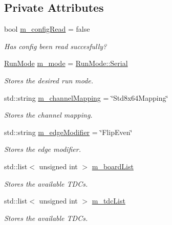 \subsection*{Private Attributes}
\begin{DoxyCompactItemize}
\item 
bool \hyperlink{class_config_a82bcc998ae058699369aee4a189f0ad1}{m\+\_\+config\+Read} = false
\begin{DoxyCompactList}\small\item\em Has config been read succesfully? \end{DoxyCompactList}\item 
\hyperlink{_modes_enum_8hpp_a3dfe11cf1a3a8121f6cd7fec4bf5947e}{Run\+Mode} \hyperlink{class_config_a65b1f233533ce1e2acd85f6a4a07c4d4}{m\+\_\+mode} = \hyperlink{_modes_enum_8hpp_a3dfe11cf1a3a8121f6cd7fec4bf5947eaab27270f353006b03c91367e05e44b94}{Run\+Mode\+::\+Serial}
\begin{DoxyCompactList}\small\item\em Stores the desired run mode. \end{DoxyCompactList}\item 
std\+::string \hyperlink{class_config_ae3e78aedeeb5fa9a2bf7dcebeb0f4f31}{m\+\_\+channel\+Mapping} = \char`\"{}Std8x64\+Mapping\char`\"{}
\begin{DoxyCompactList}\small\item\em Stores the channel mapping. \end{DoxyCompactList}\item 
std\+::string \hyperlink{class_config_a70f6a43e8c14536beb7a03807c797d69}{m\+\_\+edge\+Modifier} = \char`\"{}Flip\+Even\char`\"{}
\begin{DoxyCompactList}\small\item\em Stores the edge modifier. \end{DoxyCompactList}\item 
std\+::list$<$ unsigned int $>$ \hyperlink{class_config_a8d85379538e001e40dbc42aa5dbca616}{m\+\_\+board\+List}
\begin{DoxyCompactList}\small\item\em Stores the available T\+D\+Cs. \end{DoxyCompactList}\item 
std\+::list$<$ unsigned int $>$ \hyperlink{class_config_ac7295451d604cec09ed31ca74411c68c}{m\+\_\+tdc\+List}
\begin{DoxyCompactList}\small\item\em Stores the available T\+D\+Cs. \end{DoxyCompactList}\end{DoxyCompactItemize}


